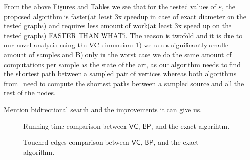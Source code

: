From the above Figures and Tables we see that for the tested values of
$\varepsilon$, the proposed algorithm is faster(at least 3x speedup in case of
exact diameter on the tested graphs) and requires less amount of work(at least
3x speed up on the tested graphs) \XXX FASTER THAN WHAT?. The reason is twofold
and it is due to our novel analysis using the VC-dimension: 1) we use a
significantly smaller amount of samples and B) only in the
worst case  we do the same amount of computations per sample as
the state of the art, as our algorithm needs to find the shortest path between a
sampled pair of vertices whereas both 
algorithms from~\citep{GeisbergerSS08,BrandesP07}  need to compute the shortest
paths between a sampled source and all the rest of the nodes.

\XXX Mention bidirectional search and the improvements it can give us.

\begin{figure*}[ht]
  \centering
  \hfill
  \hfill
  \label{fig:time}
  \caption{Running time comparison between $\mathsf{VC}$, $\mathsf{BP}$, and the
  exact algorihtm.}
\end{figure*}


\begin{figure*}[ht]
  \centering
  \hfill
  \hfil
  \hfill
  \label{fig:edges}
  \caption{Touched edges comparison between $\mathsf{VC}$, $\mathsf{BP}$, and
  the exact algorithm.}
\end{figure*}


